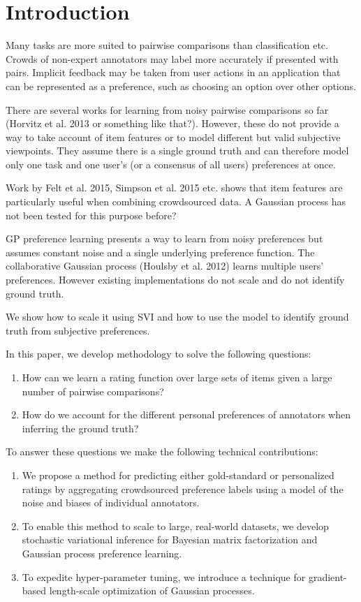 \section{Introduction}\label{sec:intro}

Many tasks are more suited to pairwise comparisons than classification etc. 
Crowds of non-expert annotators may label more accurately if presented with pairs. 
Implicit feedback may be taken from user actions in an application that can be represented as a preference, such as choosing
an option over other options.

There are several works for learning from noisy pairwise comparisons so far (Horvitz et al. 2013 or something like that?). 
However, these do not provide a way to take account of item features or to model different but valid subjective viewpoints. 
They assume there is a single ground truth and can therefore model only one task and one user's (or a consensus of all users) preferences at once. 

Work by Felt et al. 2015, Simpson et al. 2015 etc. shows that item features are particularly useful when combining crowdsourced data. A Gaussian process has not been tested for this purpose before?

GP preference learning presents a way to learn from noisy preferences but assumes constant noise and a single underlying preference function. 
The collaborative Gaussian process (Houlsby et al. 2012) learns multiple users' preferences. 
However existing implementations do not scale and do not identify ground truth. 

We show how to scale it using SVI and how to use the model to identify ground truth from subjective preferences. 

In this paper, we develop methodology to solve the following questions:
\begin{enumerate}
  \item How can we learn a rating function over large sets of items given a large number of pairwise comparisons?
  \item How do we account for the different personal preferences of annotators when inferring the ground truth?
\end{enumerate}
To answer these questions we make the following technical contributions:
\begin{enumerate}
 \item We propose a method for predicting either gold-standard or personalized ratings by aggregating crowdsourced preference labels using a model of the noise and biases of individual annotators. %
  \item %
   To enable this method to scale to large, real-world datasets, we develop
   stochastic variational inference for Bayesian matrix factorization and Gaussian process preference learning.
  \item To expedite hyper-parameter tuning, we introduce a technique for gradient-based length-scale optimization of Gaussian processes.
\end{enumerate}
